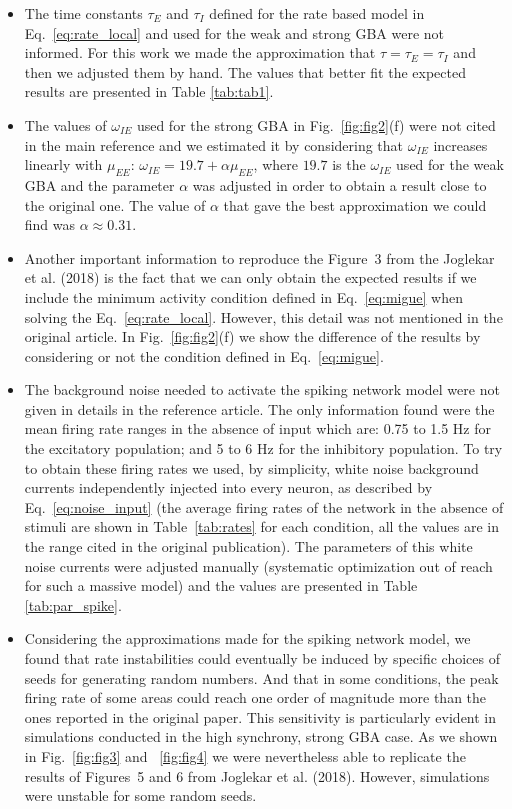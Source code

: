 \begin{itemize}
    \item The time constants $\tau_E$ and $\tau_I$ defined for the rate based model in  Eq.~\ref{eq:rate_local} and used for the weak and strong GBA were not informed. For this work we made the approximation that $\tau = \tau_E = \tau_I$ and then we adjusted them by hand. The values that better fit the expected results are presented in Table \ref{tab:tab1}.
    
    \item The values of $\omega_{IE}$ used for the strong GBA in Fig.~\ref{fig:fig2}(f) were not cited in the main reference and we estimated it by considering that $\omega_{IE}$ increases linearly with $\mu_{EE}$: $\omega_{IE}=19.7+\alpha\mu_{EE}$, where $19.7$ is the $\omega_{IE}$ used for the weak GBA and the parameter $\alpha$ was adjusted in order to obtain a result close to the original one. The value of $\alpha$ that gave the best approximation we could find was $\alpha \approx 0.31$.
    
    \item Another important information to reproduce the Figure~3 from the Joglekar et al. (2018) is the fact that we can only obtain the expected results if we include the minimum activity condition defined in Eq.~\ref{eq:migue} when solving the Eq.~\ref{eq:rate_local}. However, this detail was not mentioned in the original article. In Fig.~\ref{fig:fig2}(f) we show the difference of the results by considering or not the condition defined in Eq.~\ref{eq:migue}.
    
    \item The background noise needed to activate the spiking network model were not given in details in the reference article. The only information found were the mean firing rate ranges in the absence of input which are: 0.75 to 1.5 Hz for the excitatory population; and 5 to 6 Hz for the inhibitory population. To try to obtain these firing rates we used, by simplicity, white noise background currents independently injected into every neuron, as described by Eq.~\ref{eq:noise_input} (the average firing rates of the network in the absence of stimuli are shown in Table~\ref{tab:rates} for each condition, all the values are in the range cited in the original publication). The parameters of this white noise currents were adjusted manually (systematic optimization out of reach for such a massive model) and the values are presented in Table \ref{tab:par_spike}.  
    
    \item Considering the approximations made for the spiking network model, we found that rate instabilities could eventually be induced by specific choices of seeds for generating random numbers. And that in some conditions, the peak firing rate of some areas could reach one order of magnitude more than the ones reported in the original paper. This sensitivity is particularly evident in simulations conducted in the high synchrony, strong GBA case. As we shown in Fig.~\ref{fig:fig3} and ~\ref{fig:fig4} we were nevertheless able to replicate the results of Figures~5 and 6 from Joglekar et al. (2018). However, simulations were unstable for some random seeds.
\end{itemize}

